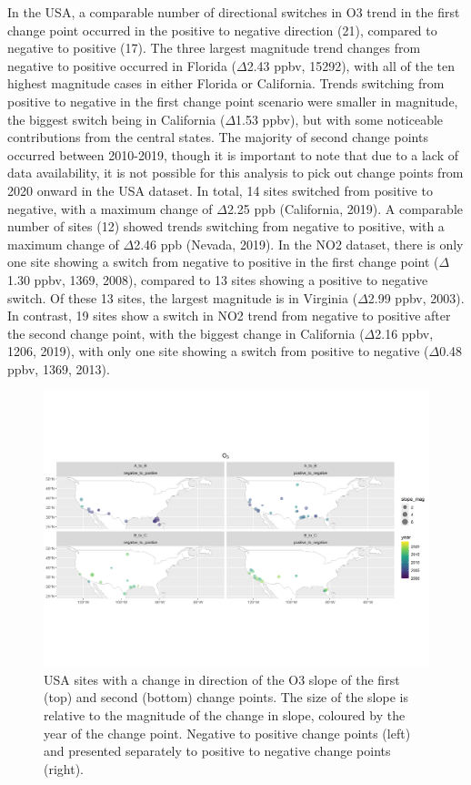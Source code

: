 \documentclass[journal abbreviation, manuscript]{copernicus}
\begin{document}
In the USA, a comparable number of directional switches in O3 trend in the first change point occurred in the positive to negative direction (21), compared to negative to positive (17). The three largest magnitude trend changes from negative to positive occurred in Florida ($\Delta$2.43 ppbv, 15292), with all of the ten highest magnitude cases in either Florida or California. Trends switching from positive to negative in the first change point scenario were smaller in magnitude, the biggest switch being in California ($\Delta$1.53 ppbv), but with some noticeable contributions from the central states. The majority of second change points occurred between 2010-2019, though it is important to note that due to a lack of data availability, it is not possible for this analysis to pick out change points from 2020 onward in the USA dataset. In total, 14 sites switched from positive to negative, with a maximum change of $\Delta$2.25 ppb (California, 2019). A comparable number of sites (12) showed trends switching from negative to positive, with a maximum change of $\Delta$2.46 ppb (Nevada, 2019). In the NO2 dataset, there is only one site showing a switch from negative to positive in the first change point ($\Delta$1.30 ppbv, 1369, 2008), compared to 13 sites showing a positive to negative switch. Of these 13 sites, the largest magnitude is in Virginia ($\Delta$2.99 ppbv, 2003). In contrast, 19 sites show a switch in NO2 trend from negative to positive after the second change point, with the biggest change in California ($\Delta$2.16 ppbv, 1206, 2019), with only one site showing a switch from positive to negative ($\Delta$0.48 ppbv, 1369, 2013).

\begin{figure}[t]
\includegraphics[width=12cm]{plots/US_o3_tau_0.5_changepoint_year_mag_map.png}
\caption{USA sites with a change in direction of the O3 slope of the first (top) and second (bottom) change points. The size of the slope is relative to the magnitude of the change in slope, coloured by the year of the change point. Negative to positive change points (left) and presented separately to positive to negative change points (right).}
\label{us_o3_changepoint_map}
\end{figure}
\end{document}
